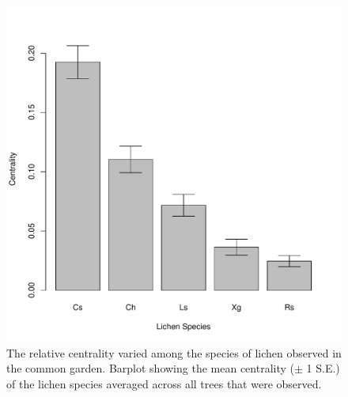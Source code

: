 \documentclass[11pt,onecolumn,lineno]{pnas-new}
\begin{document}
\begin{figure}[ht]
\centering
\includegraphics[width=\linewidth]{spp_cen.pdf}
\caption{The relative centrality varied among the species of lichen
  observed in the common garden. Barplot showing the mean centrality
  ($\pm$ 1 S.E.) of the lichen species averaged across all trees that
  were observed.}
\label{fig:spp_cen}
\end{figure}
\end{document}
